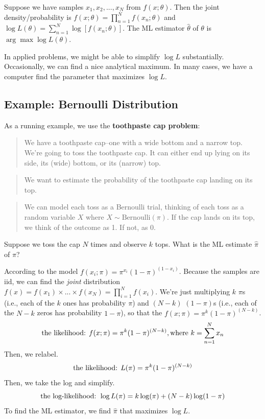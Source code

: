 \documentclass[
]{book}
\begin{document}
Suppose we have samples \(x_1, x_2, ..., x_N\) from \(f(x; \theta)\).
Then the joint density/probability is
\(f(x; \theta) = \prod_{n = 1}^N f(x_n; \theta)\) and
\(\log L(\theta) = \sum_{n = 1}^N \log \left[ f(x_n; \theta) \right]\).
The ML estimator \(\hat{\theta}\) of \(\theta\) is
\(\arg \max \log L(\theta)\).

In applied problems, we might be able to simplify \(\log L\)
substantially. Occasionally, we can find a nice analytical maximum. In
many cases, we have a computer find the parameter that maximizes
\(\log L\).

\hypertarget{example-bernoulli-distribution}{%
\subsection{Example: Bernoulli
Distribution}\label{example-bernoulli-distribution}}

As a running example, we use the \textbf{toothpaste cap problem}:

\begin{quote}
We have a toothpaste cap--one with a wide bottom and a narrow top. We're
going to toss the toothpaste cap. It can either end up lying on its
side, its (wide) bottom, or its (narrow) top.
\end{quote}

\begin{quote}
We want to estimate the probability of the toothpaste cap landing on its
top.
\end{quote}

\begin{quote}
We can model each toss as a Bernoulli trial, thinking of each toss as a
random variable \(X\) where \(X \sim \text{Bernoulli}(\pi)\). If the cap
lands on its top, we think of the outcome as 1. If not, as 0.
\end{quote}

Suppose we toss the cap \(N\) times and observe \(k\) tops. What is the
ML estimate \(\hat{\pi}\) of \(\pi\)?

According to the model
\(f(x_i; \pi) = \pi^{x_i} (1 - \pi)^{(1 - x_i)}\). Because the samples
are iid, we can find the \emph{joint} distribution
\(f(x) = f(x_1) \times ... \times f(x_N) = \prod_{i = 1}^N f(x_i)\).
We're just multiplying \(k\) \(\pi\)s (i.e., each of the \(k\) ones has
probability \(\pi\)) and \((N - k)\) \((1 - \pi)\)s (i.e., each of the
\(N - k\) zeros has probability \(1 - \pi\)), so that the
\(f(x; \pi) = \pi^{k} (1 - \pi)^{(N - k)}\). \[
\text{the likelihood:  } f(x; \pi) =  \pi^{k} (1 - \pi)^{(N - k)}, \text{where } k = \sum_{n = 1}^N x_n \\
\] Then, we relabel. \[
\text{the likelihood:  } L(\pi) = \pi^{k} (1 - \pi)^{(N - k)}\\
\] Then, we take the log and simplify. \[
\text{the log-likelihood:  } \log L(\pi) = k \log (\pi) + (N - k) \log(1 - \pi)\\
\] To find the ML estimator, we find \(\hat{\pi}\) that maximizes
\(\log L\).
\end{document}

